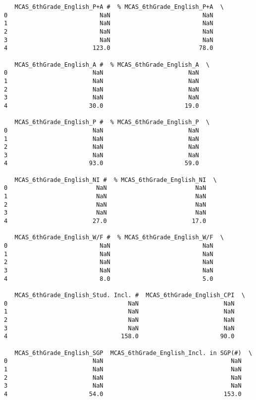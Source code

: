 \documentclass[11pt]{article}
\begin{document}
\begin{verbatim}
   MCAS_6thGrade_English_P+A #  % MCAS_6thGrade_English_P+A  \
0                          NaN                          NaN   
1                          NaN                          NaN   
2                          NaN                          NaN   
3                          NaN                          NaN   
4                        123.0                         78.0   

   MCAS_6thGrade_English_A #  % MCAS_6thGrade_English_A  \
0                        NaN                        NaN   
1                        NaN                        NaN   
2                        NaN                        NaN   
3                        NaN                        NaN   
4                       30.0                       19.0   

   MCAS_6thGrade_English_P #  % MCAS_6thGrade_English_P  \
0                        NaN                        NaN   
1                        NaN                        NaN   
2                        NaN                        NaN   
3                        NaN                        NaN   
4                       93.0                       59.0   

   MCAS_6thGrade_English_NI #  % MCAS_6thGrade_English_NI  \
0                         NaN                         NaN   
1                         NaN                         NaN   
2                         NaN                         NaN   
3                         NaN                         NaN   
4                        27.0                        17.0   

   MCAS_6thGrade_English_W/F #  % MCAS_6thGrade_English_W/F  \
0                          NaN                          NaN   
1                          NaN                          NaN   
2                          NaN                          NaN   
3                          NaN                          NaN   
4                          8.0                          5.0   

   MCAS_6thGrade_English_Stud. Incl. #  MCAS_6thGrade_English_CPI  \
0                                  NaN                        NaN   
1                                  NaN                        NaN   
2                                  NaN                        NaN   
3                                  NaN                        NaN   
4                                158.0                       90.0   

   MCAS_6thGrade_English_SGP  MCAS_6thGrade_English_Incl. in SGP(#)  \
0                        NaN                                    NaN   
1                        NaN                                    NaN   
2                        NaN                                    NaN   
3                        NaN                                    NaN   
4                       54.0                                  153.0   


\end{verbatim}
\end{document}
